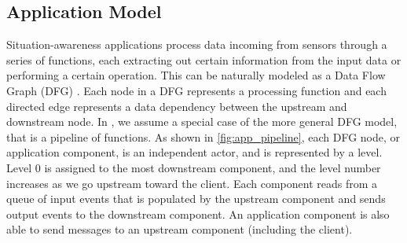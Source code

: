 \subsection{Application Model}
\label{sec:oneedge_app_model}
Situation-awareness applications process data incoming from sensors through a series of functions, each extracting out certain information from the input data or performing a certain operation. This can be naturally modeled as a Data Flow Graph (DFG) \cite{dfg}. Each node in a DFG represents a processing function and each directed edge represents a data dependency between the upstream and downstream node. In \oneedge{}, we assume a special case of the more general DFG model, that is a pipeline of functions. As shown in \cref{fig:app_pipeline}, each DFG node, or application component, is an independent actor, and is represented by a level. Level 0 is assigned to the most downstream component, and the level number increases as we go upstream toward the client. Each component reads from a queue of input events that is populated by the upstream component and sends output events to the downstream component. An application component is also able to send messages to an upstream component (including the client).

